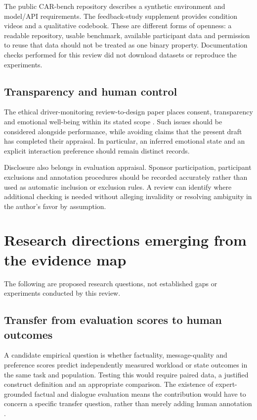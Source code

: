 \documentclass[11pt,a4paper]{article}
\begin{document}
The public CAR-bench repository describes a synthetic environment and
model/API requirements. The feedback-study supplement provides condition
videos and a qualitative codebook. These are different forms of
openness: a readable repository, usable benchmark, available participant
data and permission to reuse that data should not be treated as one
binary property. Documentation checks performed for this review did not
download datasets or reproduce the experiments.

\subsection{Transparency and human
control}\label{transparency-and-human-control}

The ethical driver-monitoring review-to-design paper places consent,
transparency and emotional well-being within its stated scope
\citep[abstract-only comparison here]{R4}. Such issues should be
considered alongside performance, while avoiding claims that the present
draft has completed their appraisal. In particular, an inferred
emotional state and an explicit interaction preference should remain
distinct records.

Disclosure also belongs in evaluation appraisal. Sponsor participation,
participant exclusions and annotation procedures should be recorded
accurately rather than used as automatic inclusion or exclusion rules. A
review can identify where additional checking is needed without alleging
invalidity or resolving ambiguity in the author's favor by assumption.

\section{Research directions emerging from the evidence
map}\label{research-directions-emerging-from-the-evidence-map}

The following are proposed research questions, not established gaps or
experiments conducted by this review.

\subsection{Transfer from evaluation scores to human
outcomes}\label{transfer-from-evaluation-scores-to-human-outcomes}

A candidate empirical question is whether factuality, message-quality
and preference scores predict independently measured workload or state
outcomes in the same task and population. Testing this would require
paired data, a justified construct definition and an appropriate
comparison. The existence of expert-grounded factual and dialogue
evaluation means the contribution would have to concern a specific
transfer question, rather than merely adding human annotation
\citep{S14, S15, S16}.
\end{document}
